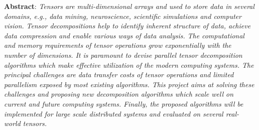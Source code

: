 \documentclass[a4paper,11pt]{article}
\begin{document}
	\tableofcontents
	\newpage
	
	
	
	
	\textbf{Abstract}: \emph{Tensors are multi-dimensional arrays and used to store data in several domains, e.g., data mining, neuroscience, scientific simulations and computer vision. Tensor decompositions help to identify inherent structure of data, achieve data compression and enable various ways of data analysis. The computational and memory requirements of tensor operations grow exponentially with the number of dimensions. It is paramount to devise parallel tensor decomposition algorithms which make effective utilization of the modern computing systems. The principal challenges are data transfer costs of tensor operations and limited parallelism exposed by most existing algorithms. This project aims at solving these challenges and proposing new decomposition algorithms which scale well on current and future computing systems. Finally, the proposed algorithms will be implemented for large scale distributed systems and evaluated on several real-world tensors.}
	
	
\end{document}
